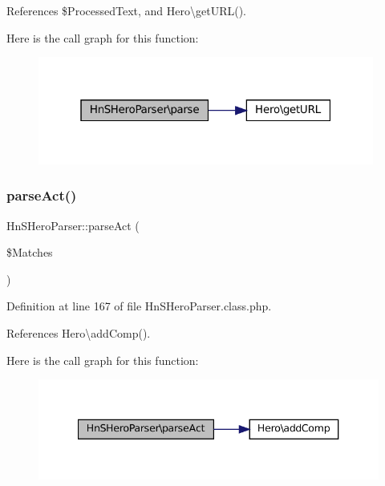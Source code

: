 References \$\+Processed\+Text, and Hero\textbackslash{}get\+U\+R\+L().

Here is the call graph for this function\+:\nopagebreak
\begin{figure}[H]
\begin{center}
\leavevmode
\includegraphics[width=313pt]{class_hn_s_hero_parser_afe4a29be403c12f8b5e2e7e0c962953a_cgraph}
\end{center}
\end{figure}
\mbox{\label{class_hn_s_hero_parser_ae5aebf1b85099d63768d7e0bbe3023d0}} 
\subsubsection{\texorpdfstring{parse\+Act()}{parseAct()}}
{\footnotesize\ttfamily Hn\+S\+Hero\+Parser\+::parse\+Act (\begin{DoxyParamCaption}\item[{}]{\$\+Matches }\end{DoxyParamCaption})\hspace{0.3cm}{\ttfamily [protected]}}



Definition at line 167 of file Hn\+S\+Hero\+Parser.\+class.\+php.



References Hero\textbackslash{}add\+Comp().

Here is the call graph for this function\+:\nopagebreak
\begin{figure}[H]
\begin{center}
\leavevmode
\includegraphics[width=340pt]{class_hn_s_hero_parser_ae5aebf1b85099d63768d7e0bbe3023d0_cgraph}
\end{center}
\end{figure}
\mbox{\label{class_hn_s_hero_parser_a2c7f954291280bae51ad06f81145ff32}} 
